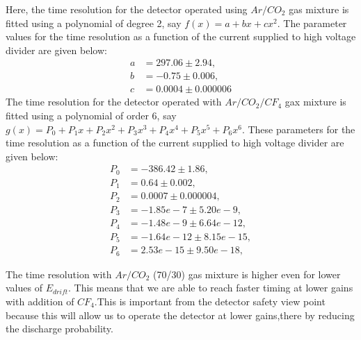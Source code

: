 Here, the time resolution for the detector operated using $Ar/CO_2$ gas mixture is fitted using a polynomial of degree 2, say $f(x) = a + bx + cx^2$. The parameter values for the time resolution as a function of the current supplied to high voltage divider are given below:
\begin{align*}
    a & =  297.06 \pm 2.94,  \nonumber \\
    b & =  -0.75 \pm 0.006,  \nonumber \\
    c & =  0.0004 \pm 0.000006 \nonumber 
\end{align*}
The time resolution for the detector operated with $Ar/CO_2/CF_4$ gax mixture is fitted using a polynomial of order 6, say $g(x) = P_0 + P_1x + P_2x^2 + P_3x^3 + P_4x^4 + P_5x^5 + P_6x^6$. These parameters for the time resolution as a function of the current supplied to high voltage divider are given below:
\begin{align*}
    P_0 & =  -386.42 \pm 1.86,  \nonumber \\
    P_1 & =  0.64 \pm 0.002, \nonumber \\
    P_2 & =  0.0007 \pm 0.000004, \nonumber \\
    P_3 & =  -1.85e-7 \pm 5.20e-9 , \nonumber \\
    P_4 & =  -1.48e-9 \pm  6.64e-12, \nonumber \\
    P_5 & =  -1.64e-12 \pm 8.15e-15 , \nonumber \\
    P_6 & =  2.53e-15 \pm 9.50e-18 , \nonumber 
\end{align*}

The time resolution with $Ar/CO_2$ (70/30) gas mixture is higher even for lower values of $E_{drift}$.
This means that we are able to reach faster timing at lower gains with addition of $CF_4$.This is important from the detector safety view point because this will allow us to operate the detector at lower gains,there by reducing the discharge probability.


